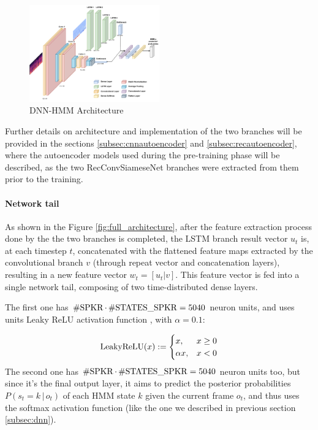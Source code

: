 \begin{figure}
	\centering
	\includegraphics[width=0.5\textwidth]{images/full_architecture}
	\caption{DNN-HMM Architecture}
	\label{fig:full_architecture}
\end{figure}
Further details on architecture and implementation of the two branches will be provided in the sections \vref{subsec:cnnautoencoder} and \vref{subsec:recautoencoder}, where the autoencoder models used during the pre-training phase will be described, as the two RecConvSiameseNet branches were extracted from them prior to the training.

\paragraph{Network tail}
As shown in the Figure \vref{fig:full_architecture}, after the feature extraction process done by the the two branches is completed, the LSTM branch result vector $u_t$ is, at each timestep $t$, concatenated with the flattened feature maps extracted by the convolutional branch $v$ (through repeat vector and concatenation layers), resulting in a new feature vector $w_t = [u_t | v]$. This feature vector is fed into a single network tail, composing of two time-distributed dense layers.

The first one has $\operatorname{\#SPKR} \cdot \operatorname{\#STATES\_SPKR} = 5040$ neuron units, and uses units Leaky ReLU activation function \cite{leakyrelu}, with $\alpha = 0.1$:

$$
\operatorname{LeakyReLU}(x) := 
\begin{cases}
	x, & x \geq 0 \\
	\alpha x, & x < 0
\end{cases}
$$
The second one has $\operatorname{\#SPKR} \cdot \operatorname{\#STATES\_SPKR} = 5040$ neuron units too, but since it's the final output layer, it aims to predict the posterior probabilities $P(s_t = k \, | \, o_t)$ of each HMM state $k$ given the current frame $o_t$, and thus uses the softmax activation function (like the one we described in previous section \vref{subsec:dnn}).

